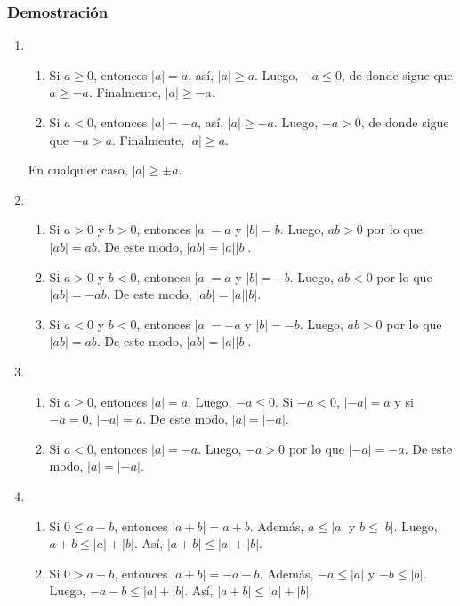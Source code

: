 \documentclass[11pt]{article}
\begin{document}
\subsubsection*{Demostración}

\begin{enumerate}[label=\alph*)]


    \item
        \begin{enumerate}[label=\roman*)]
            \item Si $a \geq 0$, entonces $|a|=a$, así, $|a| \geq a$. Luego, $-a \leq 0$, de donde sigue que $a \geq -a$. Finalmente, $|a| \geq -a$.
            \item Si $a<0$, entonces $|a|=-a$, así, $|a| \geq -a$. Luego, $-a>0$, de donde sigue que $-a>a$. Finalmente, $|a| \geq a$.
        \end{enumerate}
        En cualquier caso, $|a| \geq \pm a$.


    \item 
        \begin{enumerate}[label=\roman*)]
            \item Si $a>0$ y $b>0$, entonces $|a|=a$ y $|b|=b$. Luego, $ab>0$ por lo que $|ab|=ab$. De este modo, $|ab| =|a||b|$.
            \item Si $a>0$ y $b<0$, entonces $|a|=a$ y $|b|=-b$. Luego, $ab<0$ por lo que $|ab|=-ab$. De este modo, $|  ab|=|a||b|$.
            \item Si $a<0$ y $b<0$, entonces $|a|=-a$ y $|b|=-b$. Luego, $ab>0$ por lo que $|ab|=ab$. De este modo, $|  ab|=|a||b|$.
        \end{enumerate}


    \item 
        \begin{enumerate}[label=\roman*)]
            \item Si $a \geq 0$, entonces $|a|=a$. Luego, $-a \leq 0$. Si $-a<0$, $|-a|=a$ y si $-a=0$, $|-a|=a$. De este modo, $|a|=|-a|$.
            \item Si $a<0$, entonces $|a|=-a$. Luego, $-a>0$ por lo que $|-a|=-a$. De este modo, $|a|=|-a|$.
        \end{enumerate}

    
    \item 
        \begin{enumerate}[label=\roman*)]
            \item Si $0 \leq a+b$, entonces $|a+b|=a+b$. Además, $a \leq |a|$ y $b \leq |b|$. Luego, $a+b \leq |a|+|b|$. Así, $|a+b| \leq |a|+|b|$.
            \item Si $0 > a+b$, entonces $|a+b|=-a-b$. Además, $-a \leq |a|$ y $-b \leq |b|$. Luego, $-a-b \leq |a|+|b|$. Así, $|a+b| \leq |a|+|b|$.
        \end{enumerate}
    

\end{enumerate}
\end{document}
